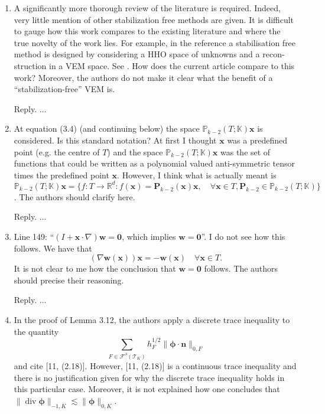 \documentclass[10pt]{amsart}
\theoremstyle{definition}
\theoremstyle{remark}
\renewcommand{\div}{\operatorname{div}}
\begin{document}
\begin{enumerate}[1.]
\item \textsf{A significantly more thorough review of the literature is required. Indeed, very little mention of other stabilization free methods are given. It is difficult to gauge how this work compares to the existing literature and where the true novelty of the work lies. For example, in the reference \cite{CicuttinErnLemaire2019} a stabilisation free method is designed by considering a HHO space of unknowns and a recon- struction in a VEM space. See \cite[Remark 5.1]{CicuttinErnLemaire2019}. How does the current article compare to this work? Moreover, the authors do not make it clear what the benefit of a “stabilization-free” VEM is.}

\smallskip \noindent \textcolor[rgb]{1.00,0.00,0.00}{Reply.}
...

\medskip

\item \textsf{At equation (3.4) (and continuing below) the space $\mathbb P_{k-2}(T;\mathbb K)\boldsymbol{x}$ is considered. Is this standard notation? At first I thought $\boldsymbol{x}$ was a predefined point (e.g. the centre of $T$) and the space $\mathbb P_{k-2}(T;\mathbb K)\boldsymbol{x}$ was the set of functions that could be written as a polynomial valued anti-symmetric tensor times the predefined point $\boldsymbol{x}$. However, I think what is actually meant is $\mathbb P_{k-2}(T;\mathbb K)\boldsymbol{x}=\{f:T\to\mathbb R^d: f(\boldsymbol{x})=\boldsymbol{P}_{k-2}(\boldsymbol{x})\boldsymbol{x},\quad \forall\boldsymbol{x}\in T, \boldsymbol{P}_{k-2}\in \mathbb P_{k-2}(T;\mathbb K)\}$. The authors should clarify here.}

\smallskip \noindent \textcolor[rgb]{1.00,0.00,0.00}{Reply.}
...

\medskip

\item \textsf{Line 149: “$(I +\boldsymbol{x}\cdot\nabla)\boldsymbol{w} = \boldsymbol{0}$, which implies $\boldsymbol{w} = \boldsymbol{0}$”. I do not see how this follows. We have that
$$(\nabla\boldsymbol{w}(\boldsymbol{x}))\boldsymbol{x}=-\boldsymbol{w}(\boldsymbol{x})\quad\forall\boldsymbol{x}\in T.
$$
It is not clear to me how the conclusion that $\boldsymbol{w} = \boldsymbol{0}$ follows. The authors
should precise their reasoning.}

\smallskip \noindent \textcolor[rgb]{1.00,0.00,0.00}{Reply.}
...

\medskip

\item \textsf{In the proof of Lemma 3.12, the authors apply a discrete trace inequality to the
quantity 
$$
\sum_{F\in\mathcal F^{\partial}(\mathcal T_K)}h_F^{1/2}\|\boldsymbol{\phi}\cdot\boldsymbol{n}\|_{0,F}
$$
and cite [11, (2.18)]. However, [11, (2.18)] is a continuous trace inequality and there is no justification given for why the discrete trace inequality holds in this particular case. Moreover, it is not explained how one concludes that $\|\div\boldsymbol{\phi}\|_{-1,K}\lesssim \|\boldsymbol{\phi}\|_{0,K}$.}


\end{enumerate}
\end{document}
